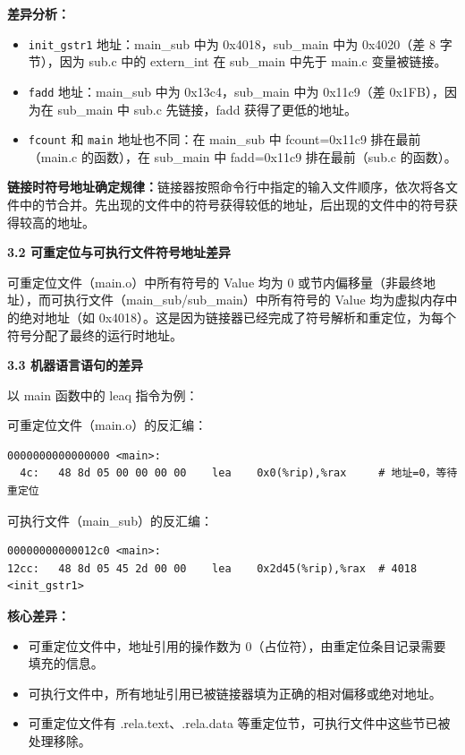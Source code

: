 \documentclass[12pt,a4paper]{ctexart}
\begin{document}
\textbf{差异分析：}
\begin{itemize}[nosep]
    \item \texttt{init\_gstr1} 地址：main\_sub 中为 0x4018，sub\_main 中为 0x4020（差 8 字节），因为 sub.c 中的 extern\_int 在 sub\_main 中先于 main.c 变量被链接。
    \item \texttt{fadd} 地址：main\_sub 中为 0x13c4，sub\_main 中为 0x11c9（差 0x1FB），因为在 sub\_main 中 sub.c 先链接，fadd 获得了更低的地址。
    \item \texttt{fcount} 和 \texttt{main} 地址也不同：在 main\_sub 中 fcount=0x11c9 排在最前（main.c 的函数），在 sub\_main 中 fadd=0x11c9 排在最前（sub.c 的函数）。
\end{itemize}

\textbf{链接时符号地址确定规律：}链接器按照命令行中指定的输入文件顺序，依次将各文件中的节合并。先出现的文件中的符号获得较低的地址，后出现的文件中的符号获得较高的地址。

\textbf{3.2 可重定位与可执行文件符号地址差异}

可重定位文件（main.o）中所有符号的 Value 均为 0 或节内偏移量（非最终地址），而可执行文件（main\_sub/sub\_main）中所有符号的 Value 均为虚拟内存中的绝对地址（如 0x4018）。这是因为链接器已经完成了符号解析和重定位，为每个符号分配了最终的运行时地址。

\textbf{3.3 机器语言语句的差异}

以 main 函数中的 leaq 指令为例：

可重定位文件（main.o）的反汇编：
\begin{lstlisting}
0000000000000000 <main>:
  4c:   48 8d 05 00 00 00 00    lea    0x0(%rip),%rax     # 地址=0，等待重定位
\end{lstlisting}

可执行文件（main\_sub）的反汇编：
\begin{lstlisting}
00000000000012c0 <main>:
12cc:   48 8d 05 45 2d 00 00    lea    0x2d45(%rip),%rax  # 4018 <init_gstr1>
\end{lstlisting}

\textbf{核心差异：}
\begin{itemize}[nosep]
    \item 可重定位文件中，地址引用的操作数为 0（占位符），由重定位条目记录需要填充的信息。
    \item 可执行文件中，所有地址引用已被链接器填为正确的相对偏移或绝对地址。
    \item 可重定位文件有 .rela.text、.rela.data 等重定位节，可执行文件中这些节已被处理移除。
\end{itemize}
\end{document}
